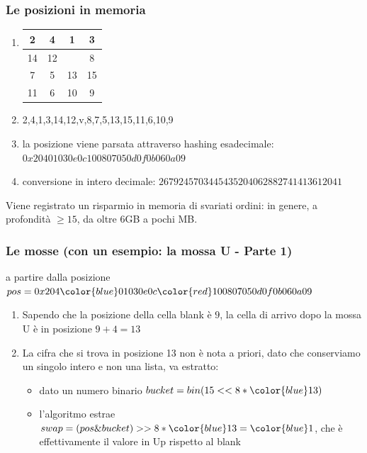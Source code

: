 \documentclass[11pt]{beamer}
\begin{document}
\begin{frame}
    \frametitle{Le posizioni in memoria}
    \begin{enumerate}
        \item \begin{table}
            \begin{tabular}{|c|c|c|c|}
                \hline
                2 & 4 & 1 & 3 \\ \hline
                14 & 12 &  & 8  \\  \hline
                7 & 5 & 13 & 15 \\ \hline
                11 & 6 & 10 & 9 \\ \hline
            \end{tabular}
        \end{table}
        \item 2,4,1,3,14,12,v,8,7,5,13,15,11,6,10,9
        \item la posizione viene parsata attraverso hashing esadecimale: $0x20401030e0c100807050d0f0b060a09$
        \item conversione in intero decimale: $2679245703445435204062882741413612041$
    \end{enumerate}
    Viene registrato un risparmio in memoria di svariati ordini: in genere, a profondità $\geq 15$, da oltre 6GB a pochi MB.
\end{frame}


\begin{frame}
    \frametitle{Le mosse (con un esempio: la mossa U - Parte 1)}
    a partire dalla posizione $pos = 0x204{\color{blue}01}030e0c{\color{red}10}0807050d0f0b060a09$
    \begin{enumerate}
    \item Sapendo che la posizione della cella blank è {\color{red} $9$}, la cella di arrivo dopo la mossa U è in posizione {\color{blue} $9+4 = 13$}
    \item La cifra che si trova in posizione {\color{blue} 13} non è nota a priori, dato che conserviamo un singolo intero e non una lista, va estratto:
        \begin{itemize}
    	\item dato un numero binario $bucket = bin(15 << 8*{\color{blue} 13})$
    	\item l'algoritmo estrae $swap = (pos\&bucket) >> 8*{\color{blue} 13} = {\color{blue} 1}$, che è effettivamente il valore in Up rispetto al blank
    	\end{itemize}
    \end{enumerate}
\end{frame}
\end{document}
